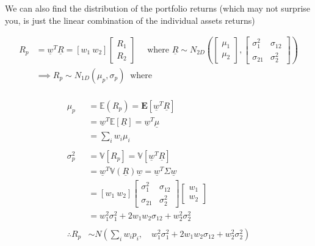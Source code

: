 \documentclass[
  oneside]{book}
\begin{document}
We can also find the distribution of the portfolio returns (which may not surprise you, is just the linear combination of the individual assets returns)

\[
\begin{aligned}
R_{p} &= \underline{w}^{T}\underline{R} = [ w_{1} \ w_{2}] \left[ \begin{array}{c}
R_{1} \\
R_{2}
\end{array} \right]  \quad 
\text{ where } \underline{R} \sim N_{2D}\left( \left[ \begin{array} {l}
\mu_{1} \\
\mu_{2}
\end{array} \right], 
\left[ \begin{array}{cc}
\sigma_{1}^{2} & \sigma_{12} \\
\sigma_{21} & \sigma_{2}^{2}
\end{array}\right]  \right)\\
&\implies R_{p} \sim N_{1D}(\mu_{p},\sigma_{p}) \ \text{ where}\\
\end{aligned}
\]

\[
\begin{aligned}
\mu_{p} &= \mathbb{E}(R_{p}) = \mathbb{\mathbf{E}}[\underline{w}^{T}\underline{R}]\\
&= \underline{w}^{T}\mathbb{E}[\underline{R}] = \underline{w}^{T}\underline{\mu}\\
&= \sum_{i}w_{i}\mu_{i}\\
\\
\sigma_{p}^{2} &= \mathbb{V}[R_{p}] = \mathbb{V}[\underline{w}^{T}\underline{R}]\\
&= \underline{w}^{T} \mathbb{V}(\underline{R})\underline{w} = \underline{w}^{T}\Sigma \underline{w}\\
&= [ w_{1} \ w_{2}] 
\left[ \begin{array}{cc}
\sigma_{1}^{2} & \sigma_{12} \\
\sigma_{21} & \sigma_{2}^{2}
\end{array}\right] \left[ \begin{array}{c}
w_{1} \\
w_{2}
\end{array} \right] \\
&= w_{1}^{2}\sigma_{1}^{2}+2w_{1}w_{2}\sigma_{12}+w_{2}^{2}\sigma_{2}^{2}\\
\\
\therefore R_{p} &\sim N\left( \sum_{i}w_{i}p_{i},  \quad w_{1}^{2}\sigma_{1}^{2}+2w_{1}w_{2}\sigma_{12}+w_{2}^{2}\sigma_{2}^{2}\right)
\end{aligned}
\]
\end{document}
